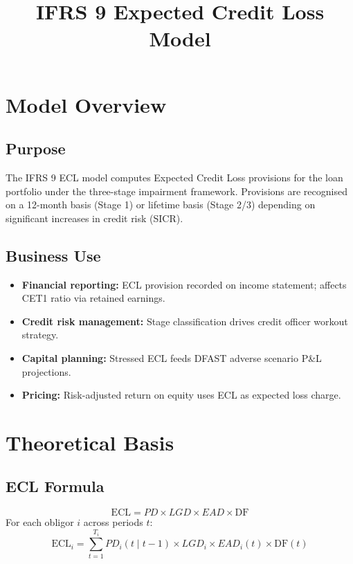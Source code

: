 \documentclass{apex_mdd}
\title{IFRS 9 Expected Credit Loss Model}
\begin{document}
\maketitle
\statusbadge

\tableofcontents
\newpage

\section{Model Overview}

\subsection{Purpose}
The IFRS 9 ECL model computes Expected Credit Loss provisions for the loan portfolio under the three-stage impairment framework. Provisions are recognised on a 12-month basis (Stage 1) or lifetime basis (Stage 2/3) depending on significant increases in credit risk (SICR).

\subsection{Business Use}
\begin{itemize}
  \item \textbf{Financial reporting:} ECL provision recorded on income statement; affects CET1 ratio via retained earnings.
  \item \textbf{Credit risk management:} Stage classification drives credit officer workout strategy.
  \item \textbf{Capital planning:} Stressed ECL feeds DFAST adverse scenario P\&L projections.
  \item \textbf{Pricing:} Risk-adjusted return on equity uses ECL as expected loss charge.
\end{itemize}

\section{Theoretical Basis}

\subsection{ECL Formula}
\begin{formulabox}
\[
  \mathrm{ECL} = PD \times LGD \times EAD \times \mathrm{DF}
\]
For each obligor $i$ across periods $t$:
\[
  \mathrm{ECL}_i = \sum_{t=1}^{T_i} PD_i(t\mid t-1) \times LGD_i \times EAD_i(t) \times \mathrm{DF}(t)
\]
\end{formulabox}
\end{document}
